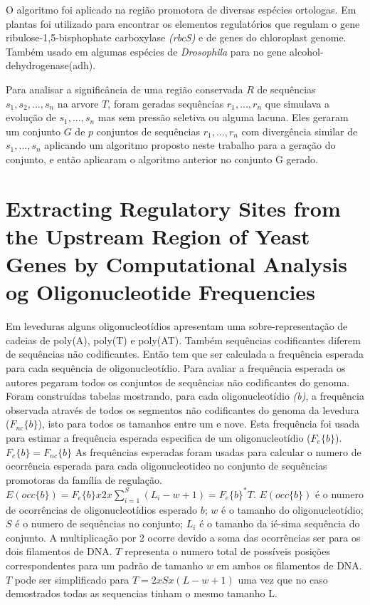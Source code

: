 O algoritmo foi aplicado na região promotora de diversas espécies ortologas. Em plantas foi utilizado para encontrar os elementos regulatórios que regulam o gene ribulose-1,5-bisphophate carboxylase \textit{(rbcS)} e de genes do chloroplast genome. Também usado em algumas espécies de \textit{Drosophila} para no gene alcohol-dehydrogenase(adh).

Para analisar a significância de uma região conservada $R$ de sequências $s_{1},s_{2},...,s_{n}$ na arvore $T$, foram geradas sequências $r_{1},...,r_{n}$ que simulava a evolução de $s_{1},...,s_{n}$ mas sem pressão seletiva ou alguma lacuna. Eles geraram um conjunto $G$ de $p$ conjuntos de sequências $r_{1},...,r_{n}$ com divergência similar de $s_{1},...,s_{n}$ aplicando um algoritmo proposto neste trabalho para a geração do conjunto, e então aplicaram o algoritmo anterior no conjunto G gerado.

\section{Extracting Regulatory Sites from the Upstream Region of Yeast Genes by Computational Analysis og Oligonucleotide Frequencies}

Em leveduras alguns oligonucleotídios apresentam uma sobre-representação de cadeias de poly(A), poly(T) e poly(AT). Também sequências codificantes diferem de sequências não codificantes.
Então tem que ser calculada a frequência esperada para cada sequência de oligonucleotídio. Para avaliar a frequência esperada os autores pegaram todos os conjuntos de sequências não codificantes do genoma. Foram construídas tabelas mostrando, para cada oligonucleotídio \textit{(b)}, a frequência observada através de todos os segmentos não codificantes do genoma da levedura ($F_{nc}\{b\}$), isto para todos os tamanhos entre um e nove. Esta frequência foi usada para estimar a frequência esperada especifica de um oligonucleotídio ($F_{e}\{b\}$).
$F_{e}\{b\} = F_{nc}\{b\}$
As frequências esperadas foram usadas para calcular o numero de ocorrência esperada para cada oligonucleotideo no conjunto de sequências promotoras da família de regulação.
$E(occ\{b\}) = F_{e}\{b\}x2x\sum_{i = 1}^{S}(L_{i}-w+1) = F_{e}\{b\}^*T$.
$E(occ\{b\})$ é o numero de ocorrências de oligonucleotídios esperado $b$; $w$ é o tamanho do oligonucleotídio; $S$ é o numero de sequências no conjunto; $L_{i}$ é o tamanho da ié-sima sequência do conjunto. A multiplicação por 2 ocorre devido a soma das ocorrências ser para os dois filamentos de DNA. $T$ representa o numero total de possíveis posições correspondentes para um padrão de tamanho $w$ em ambos os filamentos de DNA. $T$ pode ser simplificado para $T = 2xSx(L-w+1)$ uma vez que no caso demostrados todas as sequencias tinham o mesmo tamanho L.


